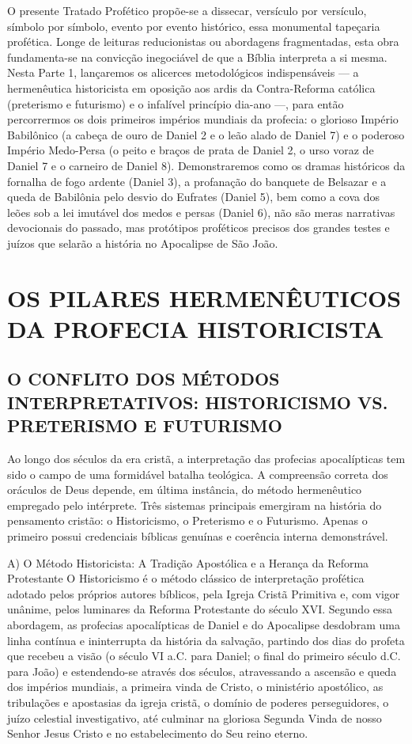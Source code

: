 \documentclass[11pt,a4paper,openany]{book}
\begin{document}
O presente Tratado Profético propõe-se a dissecar, versículo por versículo, símbolo por símbolo, evento por evento histórico, essa monumental tapeçaria profética. Longe de leituras reducionistas ou abordagens fragmentadas, esta obra fundamenta-se na convicção inegociável de que a Bíblia interpreta a si mesma. Nesta Parte 1, lançaremos os alicerces metodológicos indispensáveis — a hermenêutica historicista em oposição aos ardis da Contra-Reforma católica (preterismo e futurismo) e o infalível princípio dia-ano —, para então percorrermos os dois primeiros impérios mundiais da profecia: o glorioso Império Babilônico (a cabeça de ouro de Daniel 2 e o leão alado de Daniel 7) e o poderoso Império Medo-Persa (o peito e braços de prata de Daniel 2, o urso voraz de Daniel 7 e o carneiro de Daniel 8). Demonstraremos como os dramas históricos da fornalha de fogo ardente (Daniel 3), a profanação do banquete de Belsazar e a queda de Babilônia pelo desvio do Eufrates (Daniel 5), bem como a cova dos leões sob a lei imutável dos medos e persas (Daniel 6), não são meras narrativas devocionais do passado, mas protótipos proféticos precisos dos grandes testes e juízos que selarão a história no Apocalipse de São João.



\section{OS PILARES HERMENÊUTICOS DA PROFECIA HISTORICISTA}



\subsection{O CONFLITO DOS MÉTODOS INTERPRETATIVOS: HISTORICISMO VS. PRETERISMO E FUTURISMO}


Ao longo dos séculos da era cristã, a interpretação das profecias apocalípticas tem sido o campo de uma formidável batalha teológica. A compreensão correta dos oráculos de Deus depende, em última instância, do método hermenêutico empregado pelo intérprete. Três sistemas principais emergiram na história do pensamento cristão: o Historicismo, o Preterismo e o Futurismo. Apenas o primeiro possui credenciais bíblicas genuínas e coerência interna demonstrável.

A) O Método Historicista: A Tradição Apostólica e a Herança da Reforma Protestante
O Historicismo é o método clássico de interpretação profética adotado pelos próprios autores bíblicos, pela Igreja Cristã Primitiva e, com vigor unânime, pelos luminares da Reforma Protestante do século XVI. Segundo essa abordagem, as profecias apocalípticas de Daniel e do Apocalipse desdobram uma linha contínua e ininterrupta da história da salvação, partindo dos dias do profeta que recebeu a visão (o século VI a.C. para Daniel; o final do primeiro século d.C. para João) e estendendo-se através dos séculos, atravessando a ascensão e queda dos impérios mundiais, a primeira vinda de Cristo, o ministério apostólico, as tribulações e apostasias da igreja cristã, o domínio de poderes perseguidores, o juízo celestial investigativo, até culminar na gloriosa Segunda Vinda de nosso Senhor Jesus Cristo e no estabelecimento do Seu reino eterno.
\end{document}
